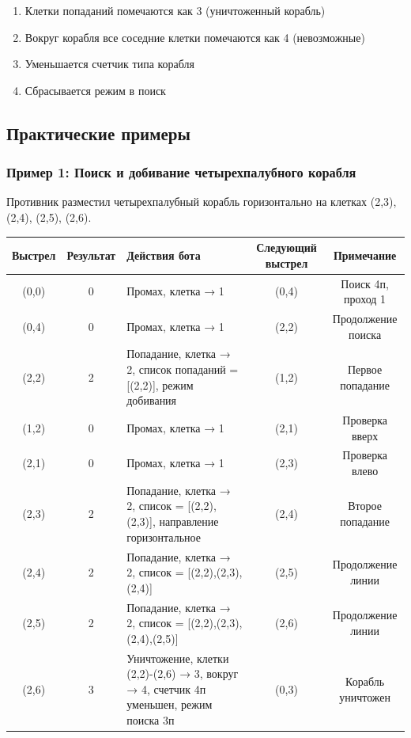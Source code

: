 \documentclass[oneside,a4paper,14pt]{extarticle}
\begin{document}
\begin{enumerate}
  \item Клетки попаданий помечаются как 3 (уничтоженный корабль)
  \item Вокруг корабля все соседние клетки помечаются как 4 (невозможные)
  \item Уменьшается счетчик типа корабля
  \item Сбрасывается режим в поиск
\end{enumerate}

\subsection*{Практические примеры}

\subsubsection*{Пример 1: Поиск и добивание четырехпалубного корабля}

Противник разместил четырехпалубный корабль горизонтально на клетках (2,3), (2,4), (2,5), (2,6).

{\footnotesize
\begin{tabular}{|c|c|p{4cm}|c|c|}
  \hline
  Выстрел & Результат & Действия бота & Следующий выстрел & Примечание \\
  \hline
  (0,0) & 0 & Промах, клетка → 1 & (0,4) & Поиск 4п, проход 1 \\
  (0,4) & 0 & Промах, клетка → 1 & (2,2) & Продолжение поиска \\
  (2,2) & 2 & Попадание, клетка → 2, список попаданий = [(2,2)], режим добивания & (1,2) & Первое попадание \\
  (1,2) & 0 & Промах, клетка → 1 & (2,1) & Проверка вверх \\
  (2,1) & 0 & Промах, клетка → 1 & (2,3) & Проверка влево \\
  (2,3) & 2 & Попадание, клетка → 2, список = [(2,2),(2,3)], направление горизонтальное & (2,4) & Второе попадание \\
  (2,4) & 2 & Попадание, клетка → 2, список = [(2,2),(2,3),(2,4)] & (2,5) & Продолжение линии \\
  (2,5) & 2 & Попадание, клетка → 2, список = [(2,2),(2,3),(2,4),(2,5)] & (2,6) & Продолжение линии \\
  (2,6) & 3 & Уничтожение, клетки (2,2)-(2,6) → 3, вокруг → 4, счетчик 4п уменьшен, режим поиска 3п & (0,3) & Корабль уничтожен \\
  \hline
\end{tabular}
}
\end{document}
